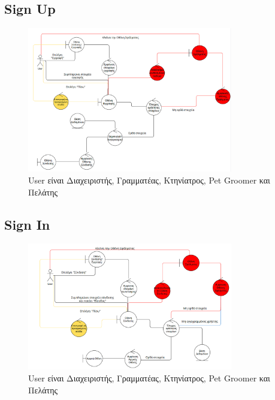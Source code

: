 \documentclass[12pt,a4paper,twoside]{book}
\begin{document}
\subsection{Sign Up}
\begin{figure}[H]
    \centering
    \includegraphics[width=0.8\textwidth]{Resources/Robustness Diagram/SignUp.png}
    \caption{User είναι Διαχειριστής, Γραμματέας, Κτηνίατρος, Pet Groomer και Πελάτης}\label{fig:robustness-signup}
\end{figure}

\subsection{Sign In}
\begin{figure}[H]
    \centering
    \includegraphics[width=0.8\textwidth]{Resources/Robustness Diagram/SignIn.png}
    \caption{User είναι Διαχειριστής, Γραμματέας, Κτηνίατρος, Pet Groomer και Πελάτης}\label{fig:robustness-signin}
\end{figure}
\end{document}
